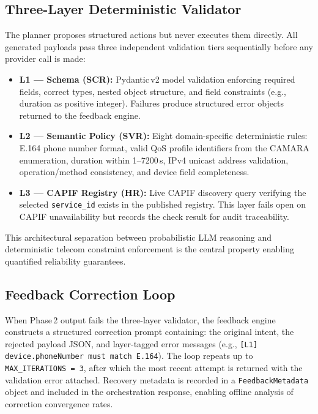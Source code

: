 \documentclass[conference]{IEEEtran}
\begin{document}
\subsection{Three-Layer Deterministic Validator}

The planner proposes structured actions but never executes them directly.
All generated payloads pass three independent validation tiers
sequentially before any provider call is made:

\begin{itemize}[leftmargin=1.1em]
  \item \textbf{L1 --- Schema (SCR):} Pydantic\,v2 model validation
        enforcing required fields, correct types, nested object structure,
        and field constraints (e.g., duration as positive integer).
        Failures produce structured error objects returned to the
        feedback engine.
  \item \textbf{L2 --- Semantic Policy (SVR):} Eight domain-specific
        deterministic rules: E.164 phone number format, valid QoS profile
        identifiers from the CAMARA enumeration, duration within
        1--7200\,s, IPv4 unicast address validation,
        operation/method consistency, and device field completeness.
  \item \textbf{L3 --- CAPIF Registry (HR):} Live CAPIF discovery query
        verifying the selected \texttt{service\_id} exists in the
        published registry. This layer fails open on CAPIF unavailability
        but records the check result for audit traceability.
\end{itemize}

This architectural separation between probabilistic LLM reasoning and
deterministic telecom constraint enforcement is the central property
enabling quantified reliability guarantees.

\subsection{Feedback Correction Loop}

When Phase\,2 output fails the three-layer validator, the feedback
engine constructs a structured correction prompt containing: the original
intent, the rejected payload JSON, and layer-tagged error messages
(e.g., \texttt{[L1] device.phoneNumber must match E.164}).
The loop repeats up to \texttt{MAX\_ITERATIONS\,=\,3}, after which the
most recent attempt is returned with the validation error attached.
Recovery metadata is recorded in a \texttt{FeedbackMetadata} object and
included in the orchestration response, enabling offline analysis of
correction convergence rates.
\end{document}
